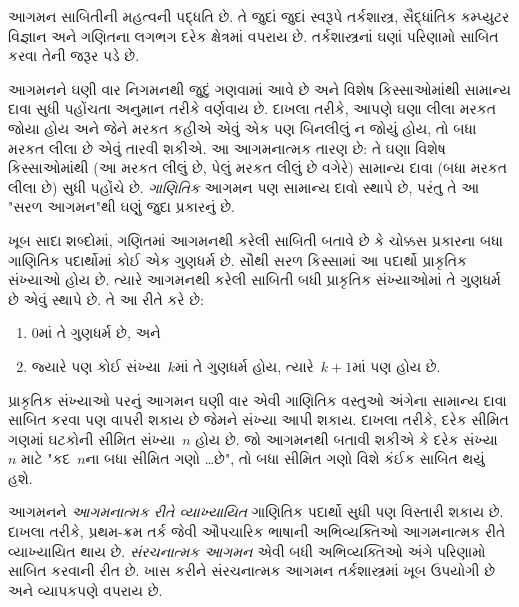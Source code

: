 \documentclass[../../../include/open-logic-section]{subfiles}
\begin{document}


આગમન સાબિતીની મહત્વની પદ્ધતિ છે. તે જુદાં જુદાં સ્વરૂપે
તર્કશાસ્ત્ર, સૈદ્ધાંતિક કમ્પ્યુટર વિજ્ઞાન અને ગણિતના લગભગ દરેક
ક્ષેત્રમાં વપરાય છે. તર્કશાસ્ત્રનાં ઘણાં પરિણામો સાબિત કરવા તેની
જરૂર પડે છે.

આગમનને ઘણી વાર નિગમનથી જુદું ગણવામાં આવે છે અને વિશેષ કિસ્સાઓમાંથી
સામાન્ય દાવા સુધી પહોંચતા અનુમાન તરીકે વર્ણવાય છે. દાખલા તરીકે,
આપણે ઘણા લીલા મરકત જોયા હોય અને જેને મરકત કહીએ એવું એક પણ
બિનલીલું ન જોયું હોય, તો બધા મરકત લીલા છે એવું તારવી શકીએ. આ
આગમનાત્મક તારણ છે: તે ઘણા વિશેષ કિસ્સાઓમાંથી (આ મરકત લીલું છે,
પેલું મરકત લીલું છે વગેરે) સામાન્ય દાવા (બધા મરકત લીલા છે) સુધી
પહોંચે છે. \emph{ગાણિતિક} આગમન પણ સામાન્ય દાવો સ્થાપે છે, પરંતુ
તે આ "સરળ આગમન"થી ઘણું જુદા પ્રકારનું છે.

ખૂબ સાદા શબ્દોમાં, ગણિતમાં આગમનથી કરેલી સાબિતી બતાવે છે કે
ચોક્કસ પ્રકારના બધા ગાણિતિક પદાર્થોમાં કોઈ એક ગુણધર્મ છે. સૌથી
સરળ કિસ્સામાં આ પદાર્થો પ્રાકૃતિક સંખ્યાઓ હોય છે. ત્યારે
આગમનથી કરેલી સાબિતી બધી પ્રાકૃતિક સંખ્યાઓમાં તે ગુણધર્મ છે
એવું સ્થાપે છે. તે આ રીતે કરે છે:
\begin{enumerate}
    \item $0$માં તે ગુણધર્મ છે, અને
    \item જ્યારે પણ કોઈ સંખ્યા~$k$માં તે ગુણધર્મ હોય, ત્યારે~$k+1$માં પણ હોય છે.
\end{enumerate}
પ્રાકૃતિક સંખ્યાઓ પરનું આગમન ઘણી વાર એવી ગાણિતિક વસ્તુઓ અંગેના
સામાન્ય દાવા સાબિત કરવા પણ વાપરી શકાય છે જેમને સંખ્યા આપી શકાય.
દાખલા તરીકે, દરેક સીમિત ગણમાં ઘટકોની સીમિત સંખ્યા~$n$ હોય છે.
જો આગમનથી બતાવી શકીએ કે દરેક સંખ્યા~$n$ માટે "કદ~$n$ના બધા
સીમિત ગણો \dots છે", તો બધા સીમિત ગણો વિશે કંઈક સાબિત થયું હશે.

આગમનને \emph{આગમનાત્મક રીતે વ્યાખ્યાયિત} ગાણિતિક પદાર્થો સુધી
પણ વિસ્તારી શકાય છે. દાખલા તરીકે, પ્રથમ-ક્રમ તર્ક જેવી
ઔપચારિક ભાષાની અભિવ્યક્તિઓ આગમનાત્મક રીતે વ્યાખ્યાયિત
થાય છે. \emph{સંરચનાત્મક આગમન} એવી બધી અભિવ્યક્તિઓ અંગે
પરિણામો સાબિત કરવાની રીત છે. ખાસ કરીને સંરચનાત્મક આગમન
તર્કશાસ્ત્રમાં ખૂબ ઉપયોગી છે અને વ્યાપકપણે વપરાય છે.
\end{document}
